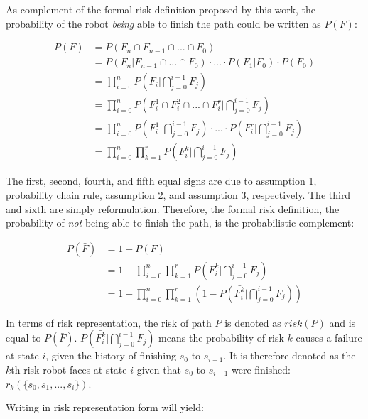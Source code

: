 \documentclass[letterpaper]{article} %
\begin{document}
As complement of the formal risk definition proposed by this work, the probability of the robot \emph{being} able to finish the path could be written as $P(F)$: 

\begin{equation}
\begin{split}
P(F) 
&= P(F_n\cap F_{n-1} \cap ... \cap F_0) \\
&= P(F_n \vert F_{n-1} \cap ... \cap F_0) \cdot ... \cdot P(F_1 \vert F_0) \cdot P(F_0)\\
&= \prod_{i=0}^{n} P(F_i \vert \bigcap_{j=0}^{i-1} F_j) \\
& = \prod_{i=0}^{n} P(F_i^1 \cap F_i^2 \cap ... \cap F_i^r \vert \bigcap_{j=0}^{i-1} F_j) \\
& = \prod_{i=0}^{n} P(F_i^1 \vert \bigcap_{j=0}^{i-1} F_j) \cdot ... \cdot P(F_i^r \vert \bigcap_{j=0}^{i-1} F_j) \\
& = \prod_{i=0}^{n} \prod_{k=1}^{r} P(F_i^k\vert \bigcap_{j=0}^{i-1} F_j)
\end{split}
\end{equation}

The first, second, fourth, and fifth equal signs are due to assumption 1, probability chain rule, assumption 2, and assumption 3, respectively. The third and sixth are simply reformulation. Therefore, the formal risk definition, the probability of \emph{not} being able to finish the path, is the probabilistic complement: 

\begin{equation}
\begin{split}
P(\bar{F}) 
&= 1 - P(F) \\
&= 1 - \prod_{i=0}^{n} \prod_{k=1}^{r} P(F_i^k \vert \bigcap_{j=0}^{i-1} F_j) \\
&= 1 - \prod_{i=0}^{n} \prod_{k=1}^{r} (1-P(\bar{F_i^k} \vert \bigcap_{j=0}^{i-1} F_j))
\end{split}
\label{eqn::pfbar}
\end{equation}

In terms of risk representation, the risk of path $P$ is denoted as $risk(P)$ and is equal to $P(\bar{F})$. $P(\bar{F_i^k} \vert \bigcap\limits_{j=0}^{i-1} F_j)$ means the probability of risk $k$ causes a failure at state $i$, given the history of finishing $s_0$ to $s_{i-1}$. It is therefore denoted as the $k$th risk robot faces at state $i$ given that $s_0$ to $s_{i-1}$ were finished: $r_k(\{s_0, s_1, ..., s_i\})$. 

Writing in risk representation form will yield: 
\end{document}
